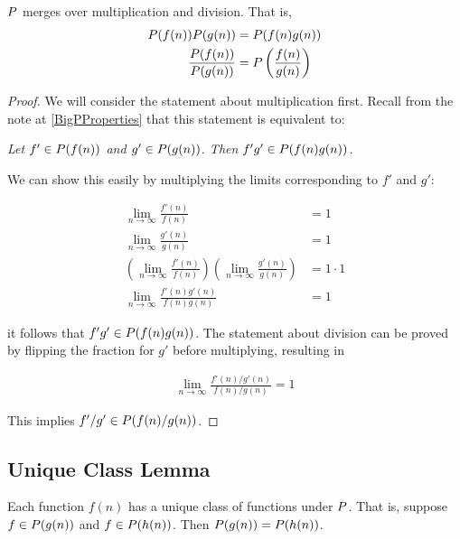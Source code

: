 \begin{theorem}
	$P$ merges over multiplication and division. That is,
	\begin{align*}
	P(f(n))P(g(n)) &= P(f(n)g(n))\\
	\frac {P(f(n))} {P(g(n))} &= P\left(\frac{f(n)} {g(n)}\right)
	\end{align*}
\end{theorem}

\begin{proof}
	We will consider the statement about multiplication first. Recall from the note at \ref{BigPProperties} that this statement is equivalent to:
	
	\textit{Let $f' \in P(f(n))$ and $g' \in P(g(n))$. Then $f'g' \in P(f(n)g(n))$.}
	
	We can show this easily by multiplying the limits corresponding to $f'$ and $g'$:
	
	\begin{align*}
	\lim_{n \to \infty} \frac{f'(n)}{f(n)} &= 1\\
	\lim_{n \to \infty} \frac{g'(n)}{g(n)} &= 1\\
	\left( \lim_{n \to \infty} \frac{f'(n)}{f(n)} \right) \left( \lim_{n \to \infty} \frac{g'(n)}{g(n)} \right) &= 1 \cdot 1\\
	\lim_{n \to \infty} \frac{f'(n)g'(n)}{f(n)g(n)} &= 1
	\end{align*}
	
	it follows that $f'g' \in P(f(n)g(n))$. The statement about division can be proved by flipping the fraction for $g'$ before multiplying, resulting in
	
	\begin{align*}
	\lim_{n \to \infty} \frac{f'(n) / g'(n)}{f(n) / g(n)} = 1
	\end{align*}
	
	This implies $f' / g' \in P(f(n) / g(n))$.
\end{proof}

\subsection{Unique Class Lemma}
\label{UniqueClassOfFunctions}

\begin{lemma}
	Each function $f(n)$ has a unique class of functions under $P$. That is, suppose $f \in P(g(n))$ and $f \in P(h(n))$. Then $P(g(n)) = P(h(n))$.
\end{lemma}

